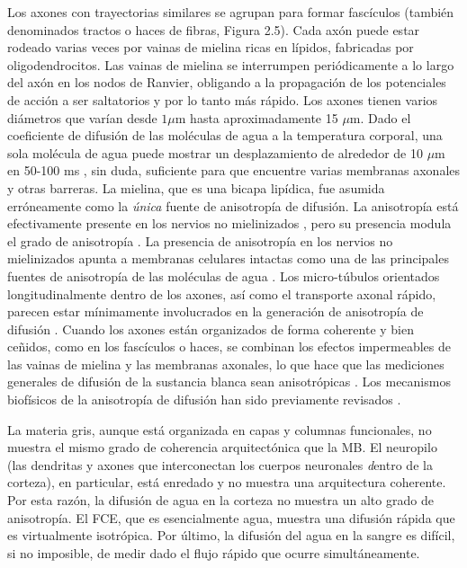 Los axones con trayectorias similares se agrupan para formar fascículos (también denominados tractos o haces de fibras, Figura 2.5). Cada axón puede estar rodeado varias veces por vainas de mielina ricas en lípidos, fabricadas por oligodendrocitos. Las vainas de mielina se interrumpen periódicamente a lo largo del axón en los nodos de Ranvier, obligando a la propagación de los potenciales de acción a ser saltatorios y por lo tanto más rápido. Los axones tienen varios diámetros que varían desde $1 \mu$m hasta aproximadamente 15 \(\mu\)m. Dado el coeficiente de difusión de las moléculas de agua a la temperatura corporal, una sola molécula de agua puede mostrar un desplazamiento de alrededor de 10 \(\mu\)m en 50-100 ms \cite{Le_Bihan_2002}, sin duda, suficiente para que encuentre varias membranas axonales y otras barreras. La mielina, que es una bicapa lipídica, fue asumida erróneamente como la \textit{única} fuente de anisotropía de difusión. La anisotropía está efectivamente presente en los nervios no mielinizados \cite{Beaulieu_1994,Gulani_2001}, pero su presencia modula el grado de anisotropía \cite{Gulani_2001,Tyszka_2006}. La presencia de anisotropía en los nervios no mielinizados apunta a membranas celulares intactas como una de las principales fuentes de anisotropía de las moléculas de agua \cite{Beaulieu_1994,Gulani_2001}. Los micro-túbulos orientados longitudinalmente dentro de los axones, así como el transporte axonal rápido, parecen estar mínimamente involucrados en la generación de anisotropía de difusión \cite{Beaulieu_1994}. Cuando los axones están organizados de forma coherente y bien ceñidos, como en los fascículos o haces, se combinan los efectos impermeables de las vainas de mielina y las membranas axonales, lo que hace que las mediciones generales de difusión de la sustancia blanca sean anisotrópicas \cite{Pierpaoli_1996,Beaulieu2002}. Los mecanismos biofísicos de la anisotropía de difusión han sido previamente revisados \cite{Beaulieu2002}.

La materia gris, aunque está organizada en capas y columnas funcionales, no muestra el mismo grado de coherencia arquitectónica que la MB. El neuropilo (las dendritas y axones que interconectan los cuerpos neuronales {\emph dentro} de la corteza), en particular, está enredado y no muestra una arquitectura coherente. Por esta razón, la difusión de agua en la corteza no muestra un alto grado de anisotropía. El FCE, que es esencialmente agua, muestra una difusión rápida que es virtualmente isotrópica. Por último, la difusión del agua en la sangre es difícil, si no imposible, de medir dado el flujo rápido que ocurre simultáneamente.

